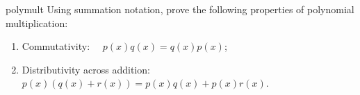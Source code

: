 
\begin {exercise}{polymult}
Using summation notation, prove the following properties of polynomial multiplication:
\begin {enumerate}[(1)]
\item
Commutativity:~~ 
$p(x) q(x) = q(x) p(x)$;
\item
Distributivity across addition:~~
$p(x) (q(x) + r(x)) =p(x)q(x) + p(x)r(x)$.
\end {enumerate}
\end {exercise}

